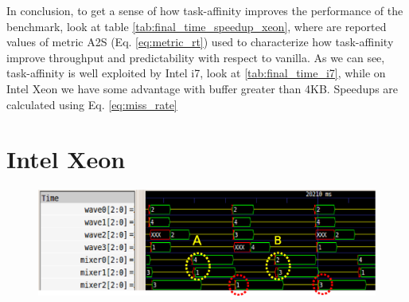 
In conclusion, to get a sense of how task-affinity improves the performance of the benchmark, look at table \ref{tab:final_time_speedup_xeon}, where are reported 
values of metric A2S (Eq. \ref{eq:metric_rt}) used to characterize how task-affinity improve throughput and predictability with respect to vanilla. As we 
can see, task-affinity is well exploited by Intel i7, look at \ref{tab:final_time_i7}, while on Intel Xeon we have some advantage with buffer greater than 4KB. Speedups are calculated using
Eq. \ref{eq:miss_rate} 

\section{Intel Xeon}

\begin{figure}[htbp]
\centering
\includegraphics[width=\widefigure]{images/results_xeon/final_xeon.eps}
\caption{}
\label{fig:final_xeon}
\end{figure}

